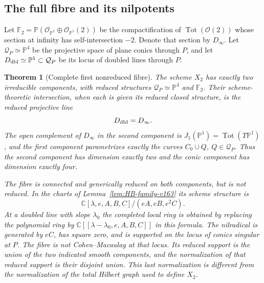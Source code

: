 \documentclass[11pt,reqno]{amsart}
\numberwithin{equation}{section}
\newtheorem{theorem}{Theorem}[section]
\theoremstyle{definition}\newtheorem{definition}[theorem]{Definition}
\theoremstyle{remark}\newtheorem{remark}[theorem]{Remark}
\newcommand{\C}{\mathbb C}\newcommand{\Q}{\mathbb Q}
\newcommand{\Pj}{\mathbb P}\newcommand{\A}{\mathbb A}
\newcommand{\OO}{\mathcal O}\newcommand{\II}{\mathcal I}
\begin{document}
\subsection{The full fibre and its nilpotents}
Let $\mathbb F_2=\Pj(\OO_{\Pj^1}\oplus\OO_{\Pj^1}(2))$ be the
compactification of $\operatorname{Tot}(\OO(2))$ whose section at
infinity has self-intersection $-2$. Denote that section by $D_\infty$.
Let $\mathcal Q_P\simeq\Pj^4$ be the projective space of plane conics
through $P$, and let $D_{\rm dbl}\simeq\Pj^1\subset\mathcal Q_P$
be its locus of doubled lines through $P$.

\begin{theorem}[Complete first nonreduced fibre]
\label{thm:complete-fibre-v163}
The scheme $X_2$ has exactly two irreducible components, with reduced
structures $\mathcal Q_P\simeq\Pj^4$ and $\mathbb F_2$. Their
scheme-theoretic intersection, when each is given its reduced closed
structure, is the reduced projective line
\[
                  D_{\rm dbl}=D_\infty.
\]
The open complement of $D_\infty$ in the second component is
$J_1(\Pj^1)=\operatorname{Tot}(T\Pj^1)$, and the first component
parametrizes exactly the curves $C_0\cup Q$, $Q\in\mathcal Q_P$.
Thus the second component has dimension exactly two and the conic
component has dimension exactly four.

The fibre is connected and generically reduced on both components,
but is not reduced. In the charts of Lemma~\ref{lem:HB-family-v163}
its scheme structure is
\begin{equation}\label{eq:full-fibre-ring-v163}
 \C[\lambda,e,A,B,C]/(eA,eB,e^2C).
\end{equation}
At a doubled line with slope $\lambda_0$ the completed local ring is
obtained by replacing the polynomial ring by
$\C[[\lambda-\lambda_0,e,A,B,C]]$ in this formula. The nilradical
is generated by $eC$, has square zero, and is supported on the locus
of conics singular at $P$. The fibre is not Cohen--Macaulay at that
locus. Its reduced support is the union of the two indicated smooth
components, and the normalization of that reduced support is their
disjoint union. This last normalization is different from the
normalization of the total Hilbert graph used to define $X_2$.
\end{theorem}
\end{document}
